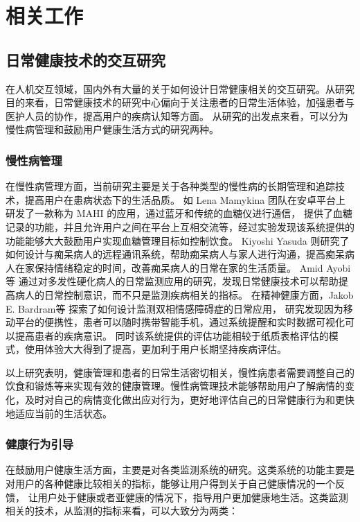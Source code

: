 \chapter{相关工作}

\section{日常健康技术的交互研究}

在人机交互领域，国内外有大量的关于如何设计日常健康相关的交互研究。从研究目的来看，日常健康技术的研究中心偏向于关注患者的日常生活体验，加强患者与医护人员的协作，提高用户的疾病认知等方面\cite{nunes2015self-care}。
从研究的出发点来看，可以分为慢性病管理和鼓励用户健康生活方式的研究两种。

\subsection{慢性病管理}
在慢性病管理方面，当前研究主要是关于各种类型的慢性病的长期管理和追踪技术，提高用户在患病状态下的生活品质。
如 Lena Mamykina \cite{mamykina2008mahi:}团队在安卓平台上研发了一款称为 MAHI 的应用，通过蓝牙和传统的血糖仪进行通信，
提供了血糖记录的功能，并且允许用户之间在平台上互相交流等，经过实验发现该系统提供的功能能够大大鼓励用户实现血糖管理目标如控制饮食。
Kiyoshi Yasuda \cite{yasuda2009remote}则研究了如何设计与痴呆病人的远程通讯系统，帮助痴呆病人与家人进行沟通，提高痴呆病人在家保持情绪稳定的时间，改善痴呆病人的日常在家的生活质量。
Amid Ayobi 等\cite{ayobi2017quantifying} 通过对多发性硬化病人的日常监测应用的研究，发现日常健康技术可以帮助提高病人的日常控制意识，而不只是监测疾病相关的指标。
在精神健康方面，Jakob E. Bardram等 \cite{bardram2013designing}探索了如何设计监测双相情感障碍症的日常应用， 研究发现因为移动平台的便携性，患者可以随时携带智能手机，通过系统提醒和实时数据可视化可以提高患者的疾病意识。
同时该系统提供的评估功能相较于纸质表格评估的模式，使用体验大大得到了提高，更加利于用户长期坚持疾病评估。

以上研究表明，健康管理和患者的日常生活密切相关，慢性病患者需要调整自己的饮食和锻炼等来实现有效的健康管理\cite{nunes2018understanding}。慢性病管理技术能够帮助用户了解病情的变化，及时对自己的病情变化做出应对行为，更好地评估自己的日常健康行为和更快地适应当前的生活状态\cite{ayobi2017quantifying}。


\subsection{健康行为引导}
在鼓励用户健康生活方面，主要是对各类监测系统的研究。这类系统的功能主要是对用户的各种健康比较相关的指标，能够让用户得到关于自己健康情况的一个反馈，
让用户处于健康或者亚健康的情况下，指导用户更加健康地生活。这类监测相关的技术，从监测的指标来看，可以大致分为两类：

